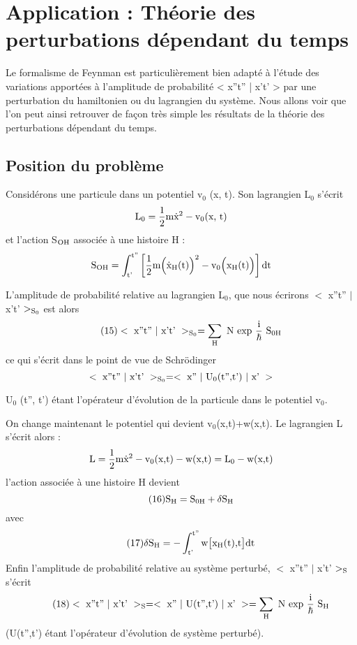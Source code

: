 \section{Application : Théorie des perturbations dépendant du temps} %

Le formalisme de Feynman est particulièrement bien adapté à
l'étude des variations apportées à l'amplitude de probabilité < x''t'' | x't' >
par une perturbation du hamiltonien ou du lagrangien du système. Nous allons
voir que l'on peut ainsi retrouver de façon très simple les résultats de la
théorie des perturbations dépendant du temps.

\subsection{Position du problème}%

Considérons une particule dans un potentiel v$_0$ (x, t).
Son lagrangien L$_0$ s'écrit
\[
\text{L}_0=\frac{1}{2}\text{m}\dot{\text{x}}^2-\text{v}_0\text{(x, t)}
\]
et l'action S$_{\text{OH}}$ associée à une histoire H :
\[
\text{S}_{\text{OH}} = \int_{\text{t'}}^{\text{t''}}\left[\frac{1}{2}\text{m}\Big(\dot{\text{x}}_{\text{H}}(\text{t})\Big)^2-\text{v}_0\Big(\text{x}_{\text{H}}\text{(t)}\Big)\right]\text{dt}
\]

L'amplitude de probabilité relative au lagrangien L$_0$, que nous écrirons
$<$ x''t'' $|$ x't' $>_{\text{S}_0}$ est alors
\[
\tag{15} <\text{ x''t'' }|\text{ x't' }>_{\text{S}_{\text{0}}}=\sum_{\text{H}}\text{ N exp }\frac{\text{i}}{\hbar}\text{ S}_{\text{0H}}
\]
ce qui s'écrit dans le point de vue de Schrödinger
\[
<\text{ x''t'' }|\text{ x't' }>_{\text{S}_0}=<\text{ x'' }|\text{ U}_0\text{(t'',t') }|\text{ x' }>
\]

U$_0$ (t'', t') étant l'opérateur d'évolution de la particule dans le potentiel v$_0$.

On change maintenant le potentiel qui devient v$_0$(x,t)+w(x,t).
Le lagrangien L s'écrit alors :
\[
\text{L}=\frac{1}{2}\text{m}\dot{\text{x}}^2-\text{v}_0(\text{x,t})-\text{w}(\text{x,t})=\text{L}_0-\text{w}(\text{x,t})
\]
l'action associée à une histoire H devient
\[
\tag{16}\text{S}_{\text{H}}=\text{S}_{\text{0H}}+\delta\text{S}_{\text{H}}
\]
avec
\[
\tag{17}\delta\text{S}_{\text{H}}=-\int_{\text{t'}}^{\text{t''}}\text{w}\big[\text{x}_{\text{H}}(\text{t})\text{,t}\big]\text{dt}
\]
Enfin l'amplitude de probabilité relative au système perturbé, $<$ x''t'' $|$ x't' $>_{\text{S}}$ s'écrit
\[
\tag{18}<\text{ x''t'' }|\text{ x't' }>_{\text{S}}=<\text{ x'' }|\text{ U(t'',t') }|\text{ x' }>=\sum_{\text{H}}\text{ N exp }\frac{\text{i}}{\hbar}\text{ S}_{\text{H}}
\]
(U(t'',t') étant l'opérateur d'évolution de système perturbé).

